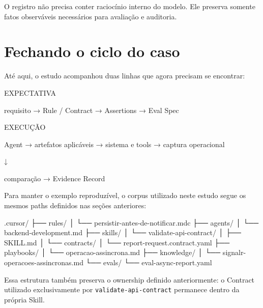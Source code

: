 \documentclass[
  10pt,
  a4paper,
  oneside]{book}
\newenvironment{Shaded}{}{}
\newcommand{\NormalTok}[1]{#1}
\renewenvironment{Shaded}{\begin{snugshade}}{\end{snugshade}}%
\begin{document}
O registro não precisa conter raciocínio interno do modelo. Ele preserva
somente fatos observáveis necessários para avaliação e auditoria.

\hypertarget{fechando-o-ciclo-do-caso}{%
\section{Fechando o ciclo do caso}\label{fechando-o-ciclo-do-caso}}

Até aqui, o estudo acompanhou duas linhas que agora precisam se
encontrar:

\begin{Shaded}
\begin{Highlighting}[]
\NormalTok{EXPECTATIVA}

\NormalTok{requisito}
\NormalTok{→ Rule / Contract}
\NormalTok{→ Assertions}
\NormalTok{→ Eval Spec}

\NormalTok{EXECUÇÃO}

\NormalTok{Agent}
\NormalTok{→ artefatos aplicáveis}
\NormalTok{→ sistema e tools}
\NormalTok{→ captura operacional}

\NormalTok{        ↓}

\NormalTok{comparação}
\NormalTok{→ Evidence Record}
\end{Highlighting}
\end{Shaded}

Para manter o exemplo reproduzível, o corpus utilizado neste estudo
segue os mesmos paths definidos nas seções anteriores:

\begin{Shaded}
\begin{Highlighting}[]
\NormalTok{.cursor/}
\NormalTok{├── rules/}
\NormalTok{│   └── persistir{-}antes{-}de{-}notificar.mdc}
\NormalTok{├── agents/}
\NormalTok{│   └── backend{-}development.md}
\NormalTok{├── skills/}
\NormalTok{│   └── validate{-}api{-}contract/}
\NormalTok{│       ├── SKILL.md}
\NormalTok{│       └── contracts/}
\NormalTok{│           └── report{-}request.contract.yaml}
\NormalTok{├── playbooks/}
\NormalTok{│   └── operacao{-}assincrona.md}
\NormalTok{├── knowledge/}
\NormalTok{│   └── signalr{-}operacoes{-}assincronas.md}
\NormalTok{└── evals/}
\NormalTok{    └── eval{-}async{-}report.yaml}
\end{Highlighting}
\end{Shaded}

Essa estrutura também preserva o ownership definido anteriormente: o
Contract utilizado exclusivamente por \texttt{validate-api-contract}
permanece dentro da própria Skill.
\end{document}
